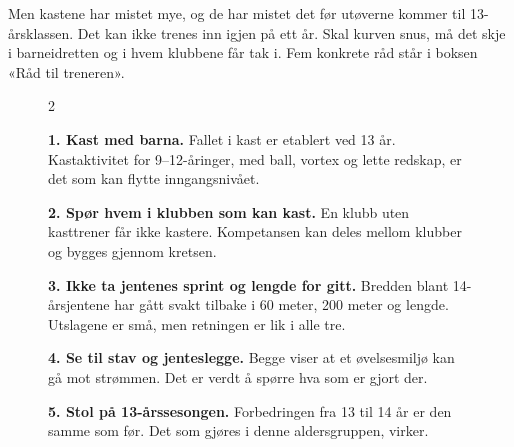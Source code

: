 Men kastene har mistet mye, og de har mistet det før utøverne kommer til 13-årsklassen. Det kan ikke trenes inn igjen på ett år. Skal kurven snus, må det skje i barneidretten og i hvem klubbene får tak i. Fem konkrete råd står i boksen «Råd til treneren».

\sluttmerke

\begin{figure}[t]
\begin{raadboks}
\begin{multicols}{2}

\textbf{1. Kast med barna.} Fallet i kast er etablert ved 13 år. Kastaktivitet for 9--12-åringer, med ball, vortex og lette redskap, er det som kan flytte inngangsnivået.

\textbf{2. Spør hvem i klubben som kan kast.} En klubb uten kasttrener får ikke kastere. Kompetansen kan deles mellom klubber og bygges gjennom kretsen.

\textbf{3. Ikke ta jentenes sprint og lengde for gitt.} Bredden blant 14-årsjentene har gått svakt tilbake i 60 meter, 200 meter og lengde. Utslagene er små, men retningen er lik i alle tre.

\textbf{4. Se til stav og jenteslegge.} Begge viser at et øvelsesmiljø kan gå mot strømmen. Det er verdt å spørre hva som er gjort der.

\textbf{5. Stol på 13-årssesongen.} Forbedringen fra 13 til 14 år er den samme som før. Det som gjøres i denne aldersgruppen, virker.

\end{multicols}
\end{raadboks}
\end{figure}

